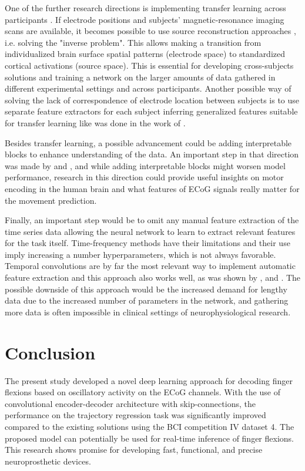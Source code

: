 \documentclass[letterpaper]{article} \usepackage{aaai22}  \usepackage{times}  \usepackage{helvet}  \usepackage{courier}  \usepackage[hyphens]{url}  \usepackage{graphicx} \urlstyle{rm} \def\UrlFont{\rm}  \usepackage{natbib}  \usepackage{caption} \DeclareCaptionStyle{ruled}{labelfont=normalfont,labelsep=colon,strut=off} \frenchspacing  \setlength{\pdfpagewidth}{8.5in}  \setlength{\pdfpageheight}{11in}  \usepackage{algorithm}
\begin{document}
One of the further research directions is implementing transfer learning across participants \citep{wan2021}. If electrode positions and subjects' magnetic-resonance imaging scans are available, it becomes possible to use source reconstruction approaches \citep{hamalainen1993, chen2002}, i.e. solving the "inverse problem". This allows making a transition from individualized brain surface spatial patterns (electrode space) to standardized cortical activations (source space). This is essential for developing cross-subjects solutions and training a network on the larger amounts of data gathered in different experimental settings and across participants. 
Another possible way of solving the lack of correspondence of electrode location between subjects is to use separate feature extractors for each subject inferring generalized features suitable for transfer learning like was done in the work of \citet{peterson2021}. 

Besides transfer learning, a possible advancement could be adding interpretable blocks to enhance understanding of the data. An important step in that direction was made by \citet{petrosyan2021} and \citet{sturm2016}, and while adding interpretable blocks might worsen model performance, research in this direction could provide useful insights on motor encoding in the human brain and what features of ECoG signals really matter for the movement prediction.

Finally, an important step would be to omit any manual feature extraction of the time series data allowing the neural network to learn to extract relevant features for the task itself. Time-frequency methods have their limitations and their use imply increasing a number hyperparameters, which is not always favorable. Temporal convolutions are by far the most relevant way to implement automatic feature extraction and this approach also works well, as was shown by \citet{li2021a}, \citet{li2021} and \citet{peterson2021}. The possible downside of this approach would be the increased demand for lengthy data due to the increased number of parameters in the network, and gathering more data is often impossible in clinical settings of neurophysiological research.  

\section{Conclusion}

The present study developed a novel deep learning approach for decoding finger flexions based on oscillatory activity on the ECoG channels. With the use of convolutional encoder-decoder architecture with skip-connections, the performance on the trajectory regression task was significantly improved compared to the existing solutions using the BCI competition IV dataset 4. The proposed model can potentially be used for real-time inference of finger flexions. This research shows promise for developing fast, functional, and precise neuroprosthetic devices. 

 
\end{document}
